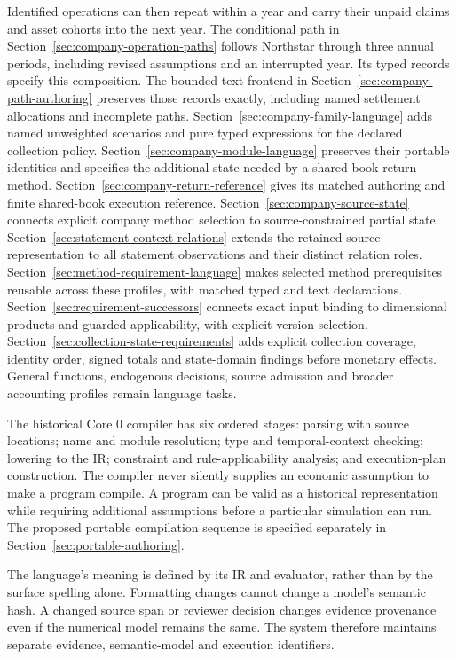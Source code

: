 Identified operations can then repeat within a year and carry their unpaid
claims and asset cohorts into the next year. The conditional path in
Section~\ref{sec:company-operation-paths} follows Northstar through three
annual periods, including revised assumptions and an interrupted year.
Its typed records specify this composition. The bounded text frontend in
Section~\ref{sec:company-path-authoring} preserves those records exactly,
including named settlement allocations and incomplete paths.
Section~\ref{sec:company-family-language} adds named unweighted scenarios and
pure typed expressions for the declared collection policy.
Section~\ref{sec:company-module-language} preserves their portable identities
and specifies the additional state needed by a shared-book return method.
Section~\ref{sec:company-return-reference} gives its matched authoring
and finite shared-book execution reference. Section~\ref{sec:company-source-state}
connects explicit company method selection to source-constrained partial state.
Section~\ref{sec:statement-context-relations} extends the retained source
representation to all statement observations and their distinct relation roles.
Section~\ref{sec:method-requirement-language} makes selected method prerequisites
reusable across these profiles, with matched typed and text declarations.
Section~\ref{sec:requirement-successors} connects exact input binding to
dimensional products and guarded applicability, with explicit version selection.
Section~\ref{sec:collection-state-requirements} adds explicit collection coverage,
identity order, signed totals and state-domain findings before monetary effects.
General functions,
endogenous decisions, source admission and broader accounting profiles remain
language tasks.

The historical Core 0 compiler has six ordered stages: parsing with source locations; name and
module resolution; type and temporal-context checking; lowering to the IR;
constraint and rule-applicability analysis; and execution-plan construction.
The compiler never silently supplies an economic assumption to make a program
compile. A program can be valid as a historical representation while requiring
additional assumptions before a particular simulation can run.
The proposed portable compilation sequence is specified separately in
Section~\ref{sec:portable-authoring}.

The language's meaning is defined by its IR and evaluator, rather than by the
surface spelling alone. Formatting changes cannot change a model's semantic
hash. A changed source span or reviewer decision changes evidence provenance
even if the numerical model remains the same. The system therefore maintains
separate evidence, semantic-model and execution identifiers.

